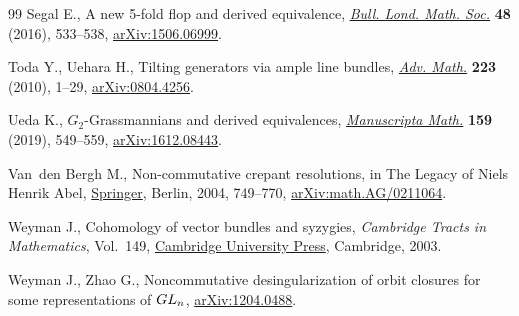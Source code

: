 \documentclass[11pt]{article}
\numberwithin{equation}{section}
\begin{document}
\begin{thebibliography}{99}
Segal E., A new 5-fold flop and derived equivalence, \href{https://doi.org/10.1112/blms/bdw026}{\textit{Bull. Lond. Math.
 Soc.}} \textbf{48} (2016), 533--538, \href{https://arxiv.org/abs/1506.06999}{arXiv:1506.06999}.

Toda Y., Uehara H., Tilting generators via ample line bundles, \href{https://doi.org/10.1016/j.aim.2009.07.006}{\textit{Adv.
 Math.}} \textbf{223} (2010), 1--29, \href{https://arxiv.org/abs/0804.4256}{arXiv:0804.4256}.

Ueda K., {$G_2$}-{G}rassmannians and derived equivalences, \href{https://doi.org/10.1007/s00229-018-1090-4}{\textit{Manuscripta
 Math.}} \textbf{159} (2019), 549--559, \href{https://arxiv.org/abs/1612.08443}{arXiv:1612.08443}.

Van~den Bergh M., Non-commutative crepant resolutions, in The Legacy of {N}iels
 {H}enrik {A}bel, \href{https://doi.org/10.1007/978-3-642-18908-1_26}{Springer}, Berlin, 2004, 749--770, \href{https://arxiv.org/abs/math.AG/0211064}{arXiv:math.AG/0211064}.

Weyman J., Cohomology of vector bundles and syzygies, \textit{Cambridge Tracts
 in Mathematics}, Vol.~149, \href{https://doi.org/10.1017/CBO9780511546556}{Cambridge University Press}, Cambridge, 2003.

Weyman J., Zhao G., Noncommutative desingularization of orbit closures for some
 representations of ${\rm GL}_n$, \href{https://arxiv.org/abs/1204.0488}{arXiv:1204.0488}.
\end{thebibliography}
\end{document}
